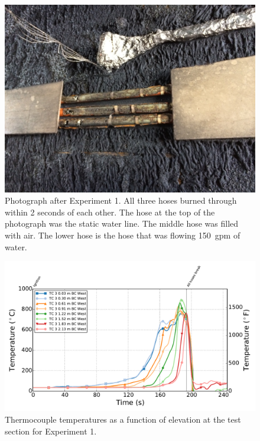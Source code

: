 \documentclass[letterpaper,11pt]{texMemo} %
\begin{document}
\begin{figure}[!ht]
\centering
\includegraphics[width=.8\columnwidth]{../Figures/Hose_Figures/hose_post_exp1}
\caption{Photograph after Experiment 1. All three hoses burned through within 2 seconds of each other. The hose at the top of the photograph was the static water line.  The middle hose was filled with air. The lower hose is the hose that was flowing 150~gpm of water.}
\label{fig:post_test1_image}
\end{figure}

\begin{figure}[!ht]
\centering
\includegraphics[width=\columnwidth]{../Figures/Hose_Figures/Test_60_West_80915_TC_A3}
\caption{Thermocouple temperatures as a function of elevation at the test section for Experiment 1.}
\label{fig:temp_A3_test60}
\end{figure}
\end{document}
